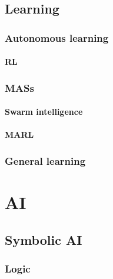 \documentclass[12pt,a4paper,openright,twoside]{book}
\begin{document}
\section{Learning}\label{sec:learning}

\subsection{Autonomous learning}\label{subsec:autonomous-learning}

\subsubsection{\Acl{RL}}\label{subsubsec:rl}

\subsection{\Aclp{MAS}}\label{subsec:mas}

\subsubsection{Swarm intelligence}\label{subsubsec:swarm-intelligence}

\subsubsection{\Acl{MARL}}\label{subsubsec:marl}

\subsection{General learning}\label{subsec:general-learning}


\chapter{\Acl{AI}}\label{ch:ai}

\section{Symbolic \ac{AI}}\label{sec:symbolic-ai}

\subsection{Logic}\label{subsec:logic}
\end{document}
